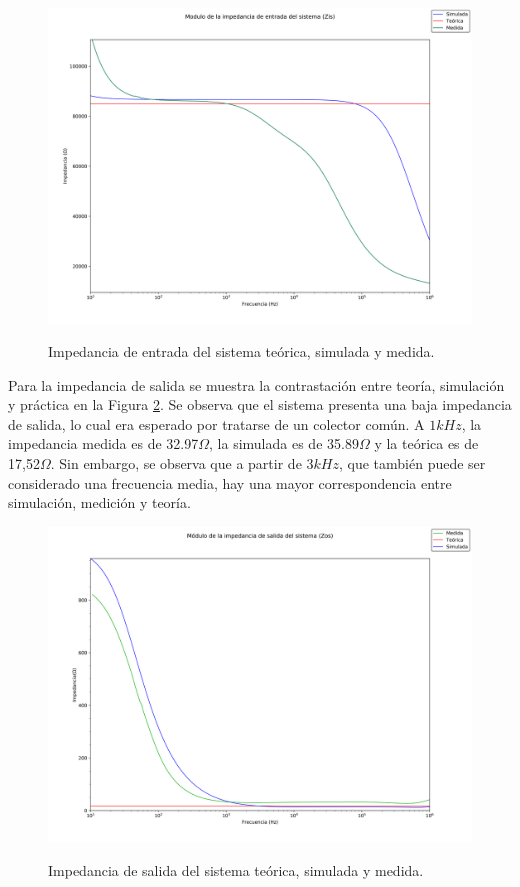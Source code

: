 	\begin{figure}[H]
		\centering
		\includegraphics[scale=0.4]{./Imagenes/Modulo_zin.png} \\
		\caption{Impedancia de entrada del sistema teórica, simulada y medida.}
		\label{fig_bode_zin}
	\end{figure}

Para la impedancia de salida se muestra la contrastación entre teoría, simulación y práctica en la Figura \ref{fig_bode_zout}. Se observa que el sistema presenta una baja impedancia de salida, lo cual era esperado por tratarse de un colector común. A $1kHz$, la impedancia medida es de 32.97$\Omega$, la simulada es de 35.89$\Omega$ y la teórica es de 17,52$\Omega$. Sin embargo, se observa que a partir de 3$kHz$, que también puede ser considerado una frecuencia media, hay una mayor correspondencia entre simulación, medición y teoría.

		\begin{figure}[H]
			\centering
			\includegraphics[scale=0.4]{./Imagenes/Modulo_zos.png} \\
			\caption{Impedancia de salida del sistema teórica, simulada y medida.}
			\label{fig_bode_zout}
		\end{figure}
 
